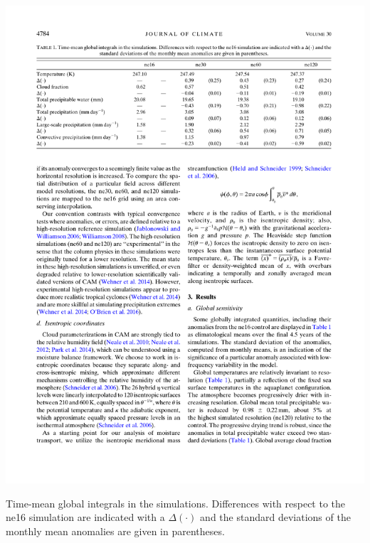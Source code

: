 \begin{table}[t]
\begin{center}
\noindent\includegraphics[width=40pc,angle=0]{chapter2/table1.pdf}\\
\end{center}
\caption{Time-mean global integrals in the simulations. Differences with respect to the ne16 simulation are indicated with a $\Delta ( \cdot )$ and the standard deviations of the monthly mean anomalies are given in parentheses.}
\label{tbl:table2-1}
\end{table}

